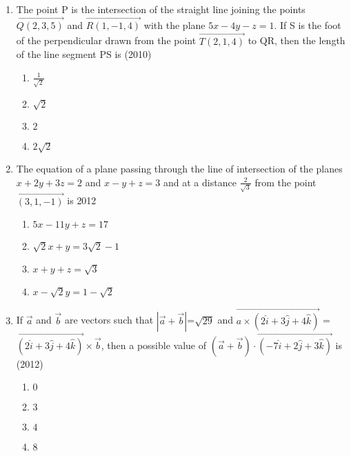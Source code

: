 \documentclass[journal,12pt,twocolumn]{IEEEtran}
\theoremstyle{remark}
\begin{document}
\begin{enumerate}
	 \item %
		 The point P is the intersection of the straight line joining the points $\vec{Q(2,3,5)}$ and $\vec{R(1,-1,4)}$ with the plane $5x-4y-z=1$. If S is the foot of the perpendicular drawn from the point $\vec{T(2,1,4)}$ to QR, then the length of the line segment PS is \hfill{(2010)}\\
\begin{enumerate}
	\item $\frac{1}{\sqrt{2}}$           
	\item $\sqrt{2}$                   
        \item $2$           
	\item $2\sqrt{2}$\\ 
\end{enumerate}
\newpage
         \item %
		 The equation of a plane passing through the line of intersection of the planes $x+2y+3z=2$ and $x-y+z=3$ and at a distance $\frac{2}{\sqrt{3}}$ from the point $\vec{(3,1,-1)}$ is \hfill{2012}\\
\begin{enumerate}
        \item $5x-11y+z=17$           
	\item $\sqrt{2}x+y=3\sqrt{2}-1$                   
	\item $x+y+z=\sqrt{3}$           
	\item $x-\sqrt{2}y=1-\sqrt{2}$\\ 
\end{enumerate}

         \item %
		 If $\vec{a}$ and $\vec{b}$ are vectors such that $|\vec{a}+\vec{b}|$=$\sqrt{29}$ and $\vec{a\times(2\hat{i}+3\hat{j}+4\hat{k})}$ = $\vec{(2\hat{i}+3\hat{j}+4\hat{k})}\times\vec{b}$, then a possible value of $(\vec{a}+\vec{b})\cdot\vec{(-7\hat{i}+2\hat{j}+3\hat{k})}$ is \hfill{(2012)}\\
\begin{enumerate}
        \item $0$                             
        \item $3$                           
        \item $4$            
        \item $8$\\          
\end{enumerate}


\end{enumerate}
\end{document}
